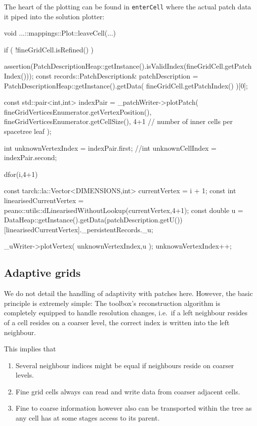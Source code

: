 \noindent
The heart of the plotting can be found in \texttt{enterCell} where the
actual patch data it piped into the solution plotter:


\begin{code}
void ...::mappings::Plot::leaveCell(...) {
 if ( !fineGridCell.isRefined() ) {
  assertion(PatchDescriptionHeap::getInstance().isValidIndex(fineGridCell.getPatchIndex()));
  const records::PatchDescription& patchDescription   
   = PatchDescriptionHeap::getInstance().getData( fineGridCell.getPatchIndex() )[0];

  const std::pair<int,int> indexPair = _patchWriter->plotPatch(
    fineGridVerticesEnumerator.getVertexPosition(),
    fineGridVerticesEnumerator.getCellSize(),
    4+1 // number of inner cells per spacetree leaf
  );

  int unknownVertexIndex = indexPair.first;
  //int unknownCellIndex   = indexPair.second;

  dfor(i,4+1) {
   const tarch::la::Vector<DIMENSIONS,int> currentVertex = i + 1;
   const int linearisedCurrentVertex 
    = peano::utils::dLinearisedWithoutLookup(currentVertex,4+1);
   const double u = DataHeap::getInstance().getData(patchDescription.getU())
    [linearisedCurrentVertex]._persistentRecords._u;

    _uWriter->plotVertex( unknownVertexIndex,u );
    unknownVertexIndex++;
  }
 }
}
\end{code}



\subsection{Adaptive grids}

We do not detail the handling of adaptivity with patches here. 
However, the basic principle is extremely simple: 
The toolbox's reconstruction algorithm is completely equipped to handle
resolution changes, i.e.~if a left neighbour resides of a cell resides on a
coarser level, the correct index is written into the left neighbour.

This implies that
\begin{enumerate}
  \item Several neighbour indices might be equal if neighbours reside on coarser
  levels.
  \item Fine grid cells always can read and write data from coarser adjacent
  cells.
  \item Fine to coarse information however also can be transported within the
  tree as any cell has at some stages access to its parent.
\end{enumerate}

